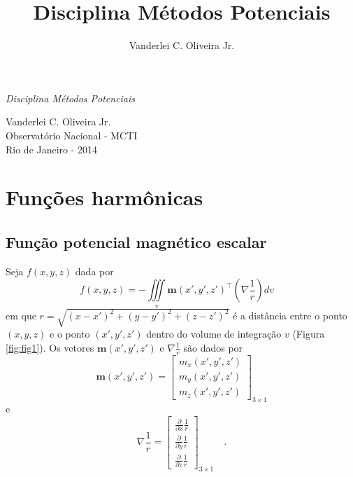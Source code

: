 \documentclass[10pt,a4paper,fleqn]{article}
\title{Disciplina M\'{e}todos Potenciais}
\author{Vanderlei C. Oliveira Jr.}
\date{}
\begin{document}
\begin{flushleft}
\begin{huge}
\emph{Disciplina M\'{e}todos Potenciais}
\end{huge}
\end{flushleft}
\begin{flushleft}
Vanderlei C. Oliveira Jr. \\
Observat\'{o}rio Nacional - MCTI \\
Rio de Janeiro - 2014
\end{flushleft}

\hrulefill

\tableofcontents

\hrulefill

\section{Funç\~{o}es harm\^{o}nicas}

\subsection{Funç\~{a}o potencial magn\'{e}tico escalar}

Seja $f(x,y,z)$ dada por
\begin{equation}
f(x,y,z) = - \iiint \limits_{v} \mathbf{m}(x',y',z')^{\intercal}
                                \left( \nabla \frac{1}{r} \right)
                                 d v \quad
\label{eq:ex11-func-f}
\end{equation}
em que $r = \sqrt{(x-x')^{2}+(y-y')^{2}+(z-z')^{2}}$ \'{e} a dist\^{a}ncia entre o ponto $(x,y,z)$
e o ponto $(x',y',z')$ dentro do volume de integraç\~{a}o $v$ (Figura \ref{fig:fig1}). Os vetores
$\mathbf{m}(x',y',z')$ e $\nabla \frac{1}{r}$ s\~{a}o dados por
\begin{equation}
\mathbf{m}(x',y',z') =
\left[
\begin{array}{c}
m_{x}(x',y',z') \\
m_{y}(x',y',z') \\
m_{z}(x',y',z')
\end{array}
\right]_{3 \times 1}
\label{eq:ex11-mag-vec}
\end{equation}
e
\begin{equation}
\nabla \frac{1}{r} =
\left[
\begin{array}{c}
\frac{\partial}{\partial x} \frac{1}{r} \\
\frac{\partial}{\partial y} \frac{1}{r} \\
\frac{\partial}{\partial z} \frac{1}{r}
\end{array}
\right]_{3 \times 1} \quad .
\label{eq:ex11-grad-invr}
\end{equation}
\end{document}
